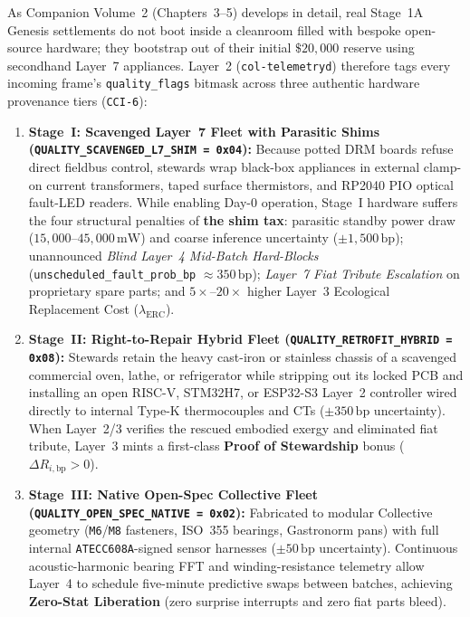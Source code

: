 As Companion Volume~2 (Chapters~3--5) develops in detail, real Stage~1A Genesis settlements do not boot inside a cleanroom filled with bespoke open-source hardware; they bootstrap out of their initial $\$20{,}000$ reserve using secondhand Layer~7 appliances. Layer~2 (\texttt{col-telemetryd}) therefore tags every incoming frame's \texttt{quality\_flags} bitmask across three authentic hardware provenance tiers (\texttt{CCI-6}):
\begin{enumerate}
    \item \textbf{Stage~I: Scavenged Layer~7 Fleet with Parasitic Shims (\texttt{QUALITY\_SCAVENGED\_L7\_SHIM = 0x04}):} Because potted DRM boards refuse direct fieldbus control, stewards wrap black-box appliances in external clamp-on current transformers, taped surface thermistors, and RP2040 PIO optical fault-LED readers. While enabling Day-0 operation, Stage~I hardware suffers the four structural penalties of \textbf{the shim tax}: parasitic standby power draw ($15{,}000\text{--}45{,}000\,\mathrm{mW}$) and coarse inference uncertainty ($\pm 1{,}500\,\mathrm{bp}$); unannounced \textit{Blind Layer~4 Mid-Batch Hard-Blocks} (\texttt{unscheduled\_fault\_prob\_bp} $\approx 350\,\mathrm{bp}$); \textit{Layer~7 Fiat Tribute Escalation} on proprietary spare parts; and $5\times\text{--}20\times$ higher Layer~3 Ecological Replacement Cost ($\lambda_{\mathrm{ERC}}$).
    \item \textbf{Stage~II: Right-to-Repair Hybrid Fleet (\texttt{QUALITY\_RETROFIT\_HYBRID = 0x08}):} Stewards retain the heavy cast-iron or stainless chassis of a scavenged commercial oven, lathe, or refrigerator while stripping out its locked PCB and installing an open RISC-V, STM32H7, or ESP32-S3 Layer~2 controller wired directly to internal Type-K thermocouples and CTs ($\pm 350\,\mathrm{bp}$ uncertainty). When Layer~2/3 verifies the rescued embodied exergy and eliminated fiat tribute, Layer~3 mints a first-class \textbf{Proof of Stewardship} bonus ($\Delta R_{i,\mathrm{bp}} > 0$).
    \item \textbf{Stage~III: Native Open-Spec Collective Fleet (\texttt{QUALITY\_OPEN\_SPEC\_NATIVE = 0x02}):} Fabricated to modular Collective geometry (\texttt{M6}/\texttt{M8} fasteners, ISO~355 bearings, Gastronorm pans) with full internal \texttt{ATECC608A}-signed sensor harnesses ($\pm 50\,\mathrm{bp}$ uncertainty). Continuous acoustic-harmonic bearing FFT and winding-resistance telemetry allow Layer~4 to schedule five-minute predictive swaps between batches, achieving \textbf{Zero-Stat Liberation} (zero surprise interrupts and zero fiat parts bleed).
\end{enumerate}
